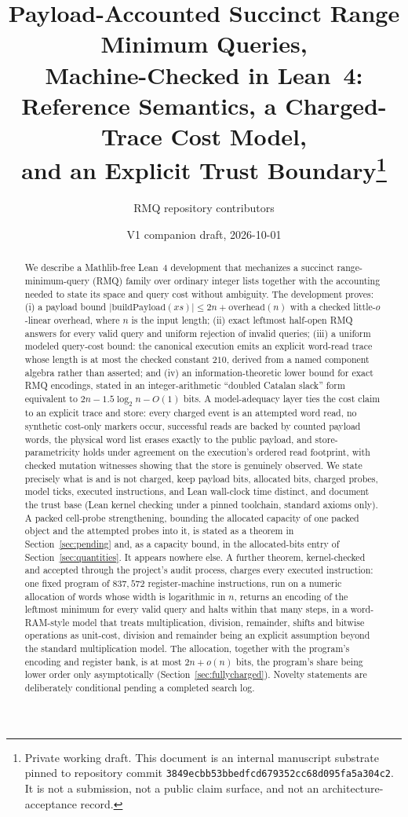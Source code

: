 \documentclass[11pt]{article}
\title{Payload-Accounted Succinct Range Minimum Queries,\\
Machine-Checked in Lean~4:\\
Reference Semantics, a Charged-Trace Cost Model,\\
and an Explicit Trust Boundary\thanks{Private working draft. This document
is an internal manuscript substrate pinned to repository commit
\nolinkurl{3849ecbb53bbedfcd679352cc68d095fa5a304c2}. It is not a submission,
not a public claim surface, and not an architecture-acceptance record.}}
\author{RMQ repository contributors}
\date{V1 companion draft, 2026-10-01}
\theoremstyle{definition}
\theoremstyle{remark}
\newcommand{\len}[1]{\lvert #1\rvert}
\begin{document}
\maketitle

\begin{abstract}
We describe a Mathlib-free Lean~4 development that mechanizes a succinct
range-minimum-query (RMQ) family over ordinary integer lists together with
the accounting needed to state its space and query cost without ambiguity.
The development proves: (i) a payload bound
$\len{\mathrm{buildPayload}(xs)} \le 2n + \mathrm{overhead}(n)$ with a
checked little-$o$-linear overhead, where $n$ is the input length;
(ii) exact leftmost half-open RMQ answers for every valid query and uniform
rejection of invalid queries; (iii) a uniform modeled query-cost bound: the
canonical execution emits an explicit word-read trace whose length is at most
the checked constant $210$, derived from a named component algebra rather
than asserted; and (iv) an information-theoretic lower bound for exact RMQ
encodings, stated in an integer-arithmetic ``doubled Catalan slack'' form
equivalent to $2n - 1.5\log_2 n - O(1)$ bits. A model-adequacy layer ties
the cost claim to an explicit trace and store: every charged event is an
attempted word read, no synthetic cost-only markers occur, successful reads
are backed by counted payload words, the physical word list erases exactly
to the public payload, and store-parametricity holds under agreement on the
execution's ordered read footprint, with checked mutation witnesses showing
that the store is genuinely observed. We state precisely what is and is not
charged, keep payload bits, allocated bits, charged probes, model ticks,
executed instructions, and Lean wall-clock time distinct, and document the
trust base (Lean kernel checking under a pinned toolchain, standard axioms
only). A packed cell-probe strengthening, bounding the allocated capacity of
one packed object and the attempted probes into it, is stated as a theorem in
Section~\ref{sec:pending} and, as a capacity bound, in the allocated-bits
entry of Section~\ref{sec:quantities}. It appears nowhere else. A further
theorem, kernel-checked and accepted through the project's audit process, charges every executed instruction: one fixed program of
$837{,}572$ register-machine instructions, run on a numeric allocation of
words whose width is logarithmic in $n$, returns an encoding of the leftmost
minimum for every valid query and halts within that many steps, in a
word-RAM-style model that treats multiplication, division, remainder, shifts
and bitwise operations as unit-cost, division and remainder being an explicit
assumption beyond the standard multiplication model. The allocation, together
with the program's encoding and register bank, is at most $2n + o(n)$ bits,
the program's share being lower order only asymptotically
(Section~\ref{sec:fullycharged}).
Novelty statements are deliberately conditional pending a completed search
log.
\end{abstract}
\end{document}

